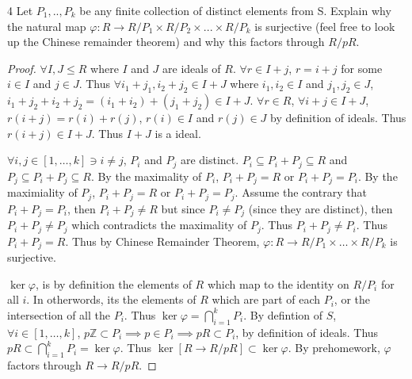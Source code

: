 \documentclass{article}
\newcommand{\Z}{\mathbb{Z}}
\begin{document}
\bigskip

\begin{PROB}{4}\label{Problem 4.}
    Let $P_1,..,P_k$ be any finite collection of distinct elements from S. Explain why the natural map $\varphi: R \to R/P_1 \times R/P_2 \times ...  \times R/P_k$ is surjective (feel free to look up the Chinese remainder theorem) and why this factors through $R/pR$.  
\end{PROB}
\begin{proof}
    $\forall I, J \leq R$ where $I$ and $J$ are ideals of $R$. $\forall r \in I + j$, $r = i  + j $ for some $i \in I$ and $j \in J$. Thus $\forall i_1 + j_1, i_2 + j_2 \in I + J$ where $i_1, i_2 \in I$ and $j_1, j_2 \in J$, $i _1 + j_2 + i_2 + j_2 = (i_1 + i_2) + (j_1 + j_2) \in I + J$. $\forall r \in R$, $\forall i + j \in I + J$, $r(i + j) = r(i) + r(j)$, $r(i) \in I$ and $r(j) \in J$ by definition of ideals. Thus $r(i + j) \in I + J$. Thus $I + J$ is a ideal.        

    $\forall i, j \in [1, \dots, k] \ni i \neq j$, $P_i$ and $P_j$ are distinct. $P_i \subseteq P_i + P_j \subseteq R$ and $P_j \subseteq P_i + P_j \subseteq R$. By the maximality of $P_i$, $P_i + P_j = R$ or $P_i + P_j = P_i$. By the maximiality of $P_j$, $P_i + P_j = R$ or $P_i + P_j = P_j$. Assume the contrary that $P_i + P_j = P_i$, then $P_i + P_j \neq R$ but since $P_i \neq P_j$ (since they are distinct), then $P_i + P_j \neq P_j$ which contradicts the maximality of $P_j$. Thus $P_i + P_j \neq P_i$. Thus $P_i + P_j = R$. Thus by Chinese Remainder Theorem, $\varphi: R \to R / P_1 \times \dots \times R / P_k$ is surjective. 
    
    $\ker \varphi$, is by definition the elements of $R$ which map to the identity on $R / P_i$ for all $i$. In otherwords, its the elements of $R$ which are part of each $P_i$, or the intersection of all the $P_i$. Thus $\ker \varphi = \bigcap_{i = 1}^k P_i$. By defintion of $S$, $\forall i \in [1, \dots, k]$, $p\Z \subset P_i \implies p \in P_i \implies pR \subset P_i$, by definition of ideals. Thus $pR \subset \bigcap_{i = 1}^k P_i = \ker \varphi$. Thus $\ker[R \to R/pR] \subset \ker \varphi$. By prehomework, $\varphi$ factors through $R \to R / pR$.      
\end{proof}

\bigskip
\end{document}
